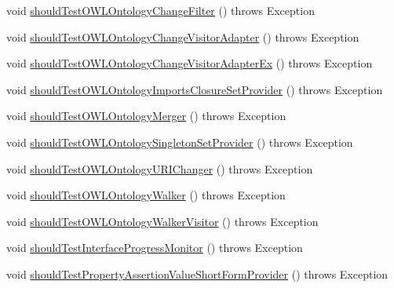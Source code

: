 \begin{DoxyCompactItemize}
\item 
void \hyperlink{classorg_1_1semanticweb_1_1owlapi_1_1contract_1_1_contract_owlapi_util_test_a02752f2db91ae325c4a466df8924fef8}{should\-Test\-O\-W\-L\-Ontology\-Change\-Filter} ()  throws Exception 
\item 
void \hyperlink{classorg_1_1semanticweb_1_1owlapi_1_1contract_1_1_contract_owlapi_util_test_a026728235f0370039196b6c361cdb074}{should\-Test\-O\-W\-L\-Ontology\-Change\-Visitor\-Adapter} ()  throws Exception 
\item 
void \hyperlink{classorg_1_1semanticweb_1_1owlapi_1_1contract_1_1_contract_owlapi_util_test_ac22f99d0554dc2f5025ee4714c8f9138}{should\-Test\-O\-W\-L\-Ontology\-Change\-Visitor\-Adapter\-Ex} ()  throws Exception 
\item 
void \hyperlink{classorg_1_1semanticweb_1_1owlapi_1_1contract_1_1_contract_owlapi_util_test_a81b742fe7fd96ac8f748ea0b016da4fa}{should\-Test\-O\-W\-L\-Ontology\-Imports\-Closure\-Set\-Provider} ()  throws Exception 
\item 
void \hyperlink{classorg_1_1semanticweb_1_1owlapi_1_1contract_1_1_contract_owlapi_util_test_a3cd8751b4da766c7cff9d75a6976c104}{should\-Test\-O\-W\-L\-Ontology\-Merger} ()  throws Exception 
\item 
void \hyperlink{classorg_1_1semanticweb_1_1owlapi_1_1contract_1_1_contract_owlapi_util_test_a72a1b6dd78b526f5c7da4f94babb2859}{should\-Test\-O\-W\-L\-Ontology\-Singleton\-Set\-Provider} ()  throws Exception 
\item 
void \hyperlink{classorg_1_1semanticweb_1_1owlapi_1_1contract_1_1_contract_owlapi_util_test_a576497012d149e2b8b1353ee3879d98b}{should\-Test\-O\-W\-L\-Ontology\-U\-R\-I\-Changer} ()  throws Exception 
\item 
void \hyperlink{classorg_1_1semanticweb_1_1owlapi_1_1contract_1_1_contract_owlapi_util_test_aede7a60514efc72a7e318f8e94f1daac}{should\-Test\-O\-W\-L\-Ontology\-Walker} ()  throws Exception 
\item 
void \hyperlink{classorg_1_1semanticweb_1_1owlapi_1_1contract_1_1_contract_owlapi_util_test_a5203fbff1e659c89693668978ab1a130}{should\-Test\-O\-W\-L\-Ontology\-Walker\-Visitor} ()  throws Exception 
\item 
void \hyperlink{classorg_1_1semanticweb_1_1owlapi_1_1contract_1_1_contract_owlapi_util_test_a8f63a9f33fa0fe603c99c3f7a8504f24}{should\-Test\-Interface\-Progress\-Monitor} ()  throws Exception 
\item 
void \hyperlink{classorg_1_1semanticweb_1_1owlapi_1_1contract_1_1_contract_owlapi_util_test_a2d40341f26a714cbfdff077b0ea465cb}{should\-Test\-Property\-Assertion\-Value\-Short\-Form\-Provider} ()  throws Exception 

\end{DoxyCompactItemize}
